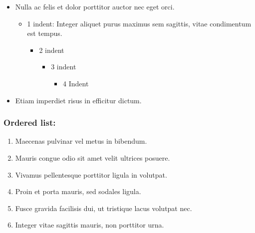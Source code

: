 \documentclass{article}
\begin{document}
\begin{itemize}
\item Nulla ac felis et dolor porttitor auctor nec eget orci.

\begin{itemize}
\item 1 indent: Integer aliquet purus maximus sem sagittis, vitae condimentum est tempus.

\begin{itemize}
\item 2 indent

\begin{itemize}
\item 3 indent

\begin{itemize}
\item 4 Indent


\end{itemize}

\end{itemize}

\end{itemize}

\end{itemize}

\item Etiam imperdiet risus in efficitur dictum.


\end{itemize}

\subsubsection{Ordered list:}\label{H8642363}


\begin{enumerate}
\item Maecenas pulvinar vel metus in bibendum. 


\item Mauris congue odio sit amet velit ultrices posuere. 


\item Vivamus pellentesque porttitor ligula in volutpat. 


\item Proin et porta mauris, sed sodales ligula. 


\item Fusce gravida facilisis dui, ut tristique lacus volutpat nec. 


\item Integer vitae sagittis mauris, non porttitor urna.  


\end{enumerate}
\end{document}
